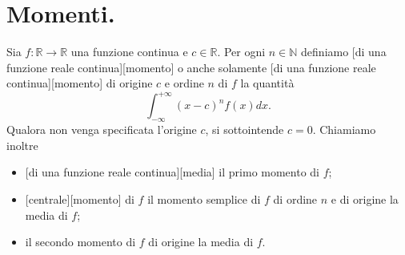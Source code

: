 \section{Momenti.}
\label{Integrali_Momenti}
\begin{Definition}
	Sia $f: \mathbb{R} \rightarrow \mathbb{R}$ una funzione continua e $c \in \mathbb{R}$. Per ogni $n \in \mathbb{N}$ definiamo [di una funzione reale continua][momento] o anche solamente [di una funzione reale continua][momento] di origine $c$ e ordine $n$ di $f$ la quantit\`a
\[
	\int_{-\infty}^{+\infty} (x - c)^n f(x) dx.
\]
	Qualora non venga specificata l'origine $c$, si sottointende $c = 0$.
	Chiamiamo inoltre
	\begin{itemize}
		\item {}[di una funzione reale continua][media] il primo momento di $f$;
		\item {}[centrale][momento] di $f$ il momento semplice di $f$ di ordine $n$ e di origine la media di $f$;
		\item {} il secondo momento di $f$ di origine la media di $f$.
	\end{itemize}
\end{Definition}
